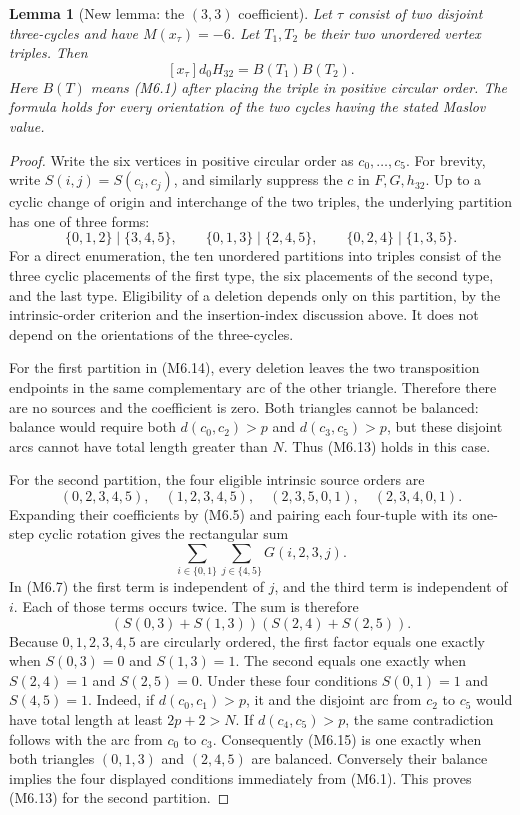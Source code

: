 \documentclass[11pt,oneside]{report}
\newtheorem{lemma}[theorem]{Lemma}
\theoremstyle{definition}
\numberwithin{equation}{section}
\begin{document}
\begin{lemma}[New lemma: the $(3,3)$ coefficient]\label{J21:lem:m6-three-three}
Let $\tau$ consist of two disjoint three-cycles and have
$M(x_\tau)=-6$. Let $T_1,T_2$ be their two unordered vertex triples.
Then
\[
                    [x_\tau]d_0H_{32}=B(T_1)B(T_2).
 \tag{M6.13}
\]
Here $B(T)$ means (M6.1) after placing the triple in positive circular
order. The formula holds for every orientation of the two cycles
having the stated Maslov value.
\end{lemma}
\begin{proof}
Write the six vertices in positive circular order as $c_0,\ldots,c_5$.
For brevity, write $S(i,j)=S(c_i,c_j)$, and similarly suppress the
$c$ in $F,G,h_{32}$.
Up to a cyclic change of origin and interchange of the two triples,
the underlying partition has one of three forms:
\[
 \{0,1,2\}\mid\{3,4,5\},\qquad
 \{0,1,3\}\mid\{2,4,5\},\qquad
 \{0,2,4\}\mid\{1,3,5\}.
 \tag{M6.14}
\]
For a direct enumeration, the ten unordered partitions into triples
consist of the three cyclic placements of the first type, the six
placements of the second type, and the last type.
Eligibility of a deletion depends only on this partition, by the
intrinsic-order criterion and the insertion-index discussion above.
It does not depend on the orientations of the three-cycles.

For the first partition in (M6.14), every deletion leaves the two
transposition endpoints in the same complementary arc of the other
triangle. Therefore there are no sources and the coefficient is zero.
Both triangles cannot be balanced: balance would require both
$d(c_0,c_2)>p$ and $d(c_3,c_5)>p$, but these disjoint arcs cannot
have total length greater than $N$. Thus (M6.13) holds in this case.

For the second partition, the four eligible intrinsic source orders
are
\[
 (0,2,3,4,5),\quad (1,2,3,4,5),\quad
 (2,3,5,0,1),\quad (2,3,4,0,1).
\]
Expanding their coefficients by (M6.5) and pairing each four-tuple
with its one-step cyclic rotation gives the rectangular sum
\[
                    \sum_{i\in\{0,1\}}\sum_{j\in\{4,5\}}G(i,2,3,j).
\]
In (M6.7) the first term is independent of $j$, and the third term
is independent of $i$. Each of those terms occurs twice. The sum is
therefore
\[
                 (S(0,3)+S(1,3))(S(2,4)+S(2,5)).
 \tag{M6.15}
\]
Because $0,1,2,3,4,5$ are circularly ordered, the first factor equals
one exactly when $S(0,3)=0$ and $S(1,3)=1$. The second equals one
exactly when $S(2,4)=1$ and $S(2,5)=0$.
Under these four conditions $S(0,1)=1$ and $S(4,5)=1$.
Indeed, if $d(c_0,c_1)>p$, it and the disjoint arc from $c_2$ to
$c_5$ would have total length at least $2p+2>N$.
If $d(c_4,c_5)>p$, the same contradiction follows with the arc
from $c_0$ to $c_3$.
Consequently (M6.15) is one exactly when both triangles
$(0,1,3)$ and $(2,4,5)$ are balanced. Conversely their balance
implies the four displayed conditions immediately from (M6.1).
This proves (M6.13) for the second partition.


\end{proof}
\end{document}

